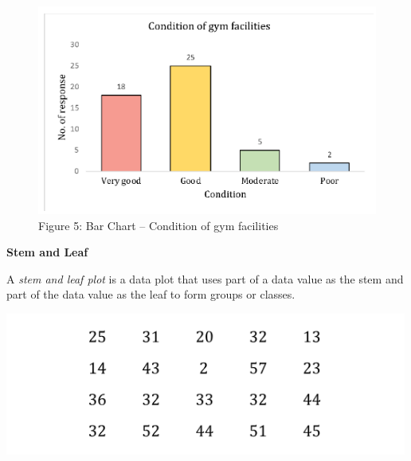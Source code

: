 \documentclass[
  a4paper,
  DIV=11,
  numbers=noendperiod,
  oneside]{scrreprt}
\begin{document}
\begin{figure}

{\centering \includegraphics[width=5.20833in,height=\textheight]{images/ch2/picture6.png}

}

\caption{Figure 5: Bar Chart -- Condition of gym facilities}

\end{figure}

\textbf{Stem and Leaf}

A \emph{stem and leaf plot} is a data plot that uses part of a data
value as the stem and part of the data value as the leaf to form groups
or classes.

\includegraphics[width=5.20833in,height=\textheight]{images/ch2/picture7.png}
\end{document}
